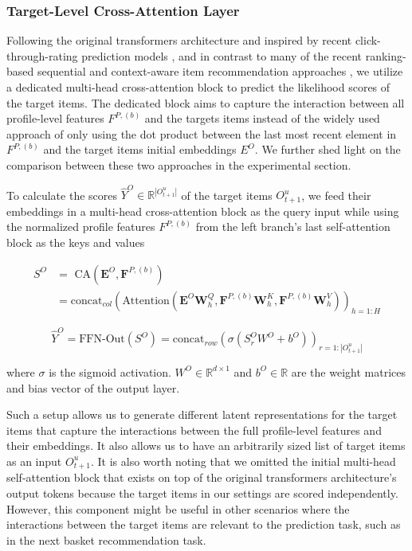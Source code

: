 \documentclass[sigconf,natbib=true]{acmart}
\begin{document}
\subsubsection{Target-Level Cross-Attention Layer}
Following the original transformers architecture and inspired by recent click-through-rating prediction models \cite{zhou2019deep}, and in contrast to many of the recent ranking-based sequential and context-aware item recommendation approaches \cite{kang2018self,ZhouWZZWZWW20,wu2020sse,wang2020time,wang2020next}, we utilize a dedicated multi-head cross-attention block to predict the likelihood scores of the target items. The dedicated block aims to capture the interaction between all profile-level features $F^{P,(b)}$ and the targets items instead of the widely used approach of only using the dot product between the last most recent element in $F^{P,(b)} $ and the target items initial embeddings $E^{O}$. We further shed light on the comparison between these two approaches in the experimental section.

To calculate the scores $\hat{Y}^{O} \in \mathbb{R}^{|O^{u}_{t+1}|} $ of the target items $O^{u}_{t+1}$, we feed their embeddings in a multi-head cross-attention block as the query input while using the normalized profile features $F^{P,(b)}$ from the left branch's last self-attention block as the keys and values

\begin{equation} 
\begin{split}
S^{O} &= \textrm{ CA}(\textbf{E}^{O},\textbf{F}^{P,(b)}) \\&=  \text{concat}_{col} \left(\textrm{Attention}(\textbf{E}^{O}\textbf{W}^{Q}_{h}, \textbf{F}^{P,(b)}\textbf{W}^{K}_{h}, \textbf{F}^{P,(b)}\textbf{W}^{V}_{h})\right)_{h=1:H}
\end{split}
\end{equation} 

\begin{equation} 
\hat{Y}^{O} = \textrm{FFN-Out}(S^{O}) = \text{concat}_{row} \left( \sigma(S^{O}_r W^{O} + b^{O}) \right)_{r=1:|O^{u}_{t+1}|}
\end{equation} 

\noindent where $\sigma$ is the sigmoid activation. $W^{O} \in \mathbb{R}^{d \times 1}$ and $b^{O} \in \mathbb{R}$ are the weight matrices and bias vector of the output layer. 

Such a setup allows us to generate different latent representations for the target items that capture the interactions between the full profile-level features and their embeddings. It also allows us to have an arbitrarily sized list of target items as an input $O^{u}_{t+1}$. It is also worth noting that we omitted the initial multi-head self-attention block that exists on top of the original transformers architecture's output tokens because the target items in our settings are scored independently. However, this component might be useful in other scenarios where the interactions between the target items are relevant to the prediction task, such as in the next basket recommendation task.
\end{document}
